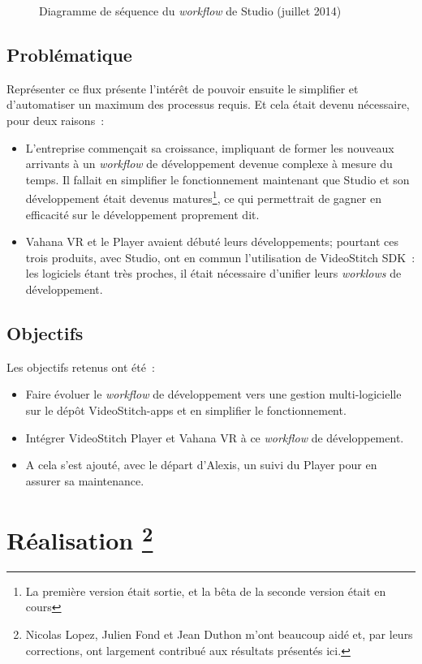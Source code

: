 \begin{figure}
  \centering
  \caption{Diagramme de séquence du \textit{workflow} de Studio (juillet 2014)}
	\label{workflow-studio}
\end{figure}

\subsection{Problématique}
Représenter ce flux présente l'intérêt de pouvoir ensuite le simplifier et d'automatiser
un maximum des processus requis. Et cela était devenu nécessaire, pour deux raisons~:
\begin{itemize}
  \item L'entreprise commençait sa croissance, impliquant de former les nouveaux arrivants
  à un \textit{workflow} de développement devenue complexe à mesure du temps. Il fallait en
  simplifier le fonctionnement maintenant que Studio et son développement était
  devenus matures\footnote{La première version était sortie, et la bêta de la seconde
  version était en cours}, ce qui permettrait de gagner en efficacité sur le développement
  proprement dit.
  \item Vahana VR et le Player avaient débuté leurs développements; pourtant ces trois
  produits, avec Studio, ont en commun l'utilisation de VideoStitch SDK~: les logiciels
  étant très proches, il était nécessaire d'unifier leurs \textit{worklows} de développement.
\end{itemize}

\subsection{Objectifs}
Les objectifs retenus ont été~:
\begin{itemize}
  \item Faire évoluer le \textit{workflow} de développement vers une gestion multi-logicielle sur le dépôt VideoStitch-apps 
  et en simplifier le fonctionnement.
  \item Intégrer VideoStitch Player et Vahana VR à ce \textit{workflow} de développement.
  \item A cela s'est ajouté, avec le départ d'Alexis, un suivi du Player pour en assurer
  sa maintenance.
\end{itemize}


\section[Réalisation]{Réalisation
\protect\footnote{Nicolas Lopez, Julien Fond et Jean Duthon m'ont beaucoup aidé et, par 
leurs corrections, ont largement contribué aux résultats présentés ici.}}

